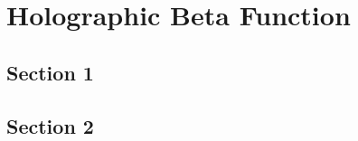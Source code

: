 %
%
\chapter{Holographic Beta Function}%
\label{chapter:deformation_to_potential}

\section{Section 1}
\lipsum[41-45]

\section{Section 2}
\lipsum[46-50]
